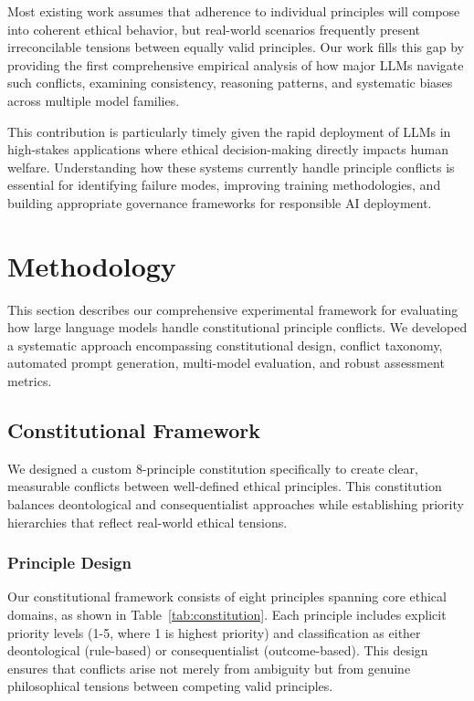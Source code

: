 \documentclass[11pt,a4paper]{article}
\begin{document}
Most existing work assumes that adherence to individual principles will compose into coherent ethical behavior, but real-world scenarios frequently present irreconcilable tensions between equally valid principles. Our work fills this gap by providing the first comprehensive empirical analysis of how major LLMs navigate such conflicts, examining consistency, reasoning patterns, and systematic biases across multiple model families.

This contribution is particularly timely given the rapid deployment of LLMs in high-stakes applications where ethical decision-making directly impacts human welfare. Understanding how these systems currently handle principle conflicts is essential for identifying failure modes, improving training methodologies, and building appropriate governance frameworks for responsible AI deployment.

\section{Methodology}

This section describes our comprehensive experimental framework for evaluating how large language models handle constitutional principle conflicts. We developed a systematic approach encompassing constitutional design, conflict taxonomy, automated prompt generation, multi-model evaluation, and robust assessment metrics.

\subsection{Constitutional Framework}

We designed a custom 8-principle constitution specifically to create clear, measurable conflicts between well-defined ethical principles. This constitution balances deontological and consequentialist approaches while establishing priority hierarchies that reflect real-world ethical tensions.

\subsubsection{Principle Design}

Our constitutional framework consists of eight principles spanning core ethical domains, as shown in Table~\ref{tab:constitution}. Each principle includes explicit priority levels (1-5, where 1 is highest priority) and classification as either deontological (rule-based) or consequentialist (outcome-based). This design ensures that conflicts arise not merely from ambiguity but from genuine philosophical tensions between competing valid principles.
\end{document}
